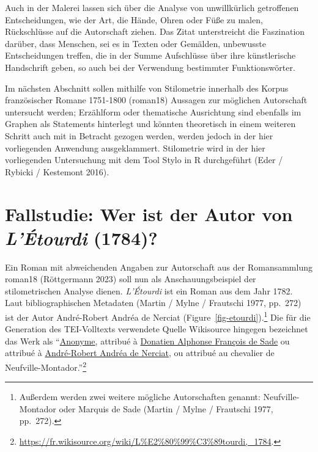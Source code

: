\documentclass[
  12pt,
  letterpaper,
  DIV=11,
  numbers=noendperiod]{scrreprt}
\begin{document}
Auch in der Malerei lassen sich über die Analyse von unwillkürlich
getroffenen Entscheidungen, wie der Art, die Hände, Ohren oder Füße zu
malen, Rückschlüsse auf die Autorschaft ziehen. Das Zitat unterstreicht
die Faszination darüber, dass Menschen, sei es in Texten oder Gemälden,
unbewusste Entscheidungen treffen, die in der Summe Aufschlüsse über
ihre künstlerische Handschrift geben, so auch bei der Verwendung
bestimmter Funktionswörter.

Im nächsten Abschnitt sollen mithilfe von Stilometrie innerhalb des
Korpus französischer Romane 1751-1800 (roman18) Aussagen zur möglichen
Autorschaft untersucht werden; Erzählform oder thematische Ausrichtung
sind ebenfalls im Graphen als Statements hinterlegt und könnten
theoretisch in einem weiteren Schritt auch mit in Betracht gezogen
werden, werden jedoch in der hier vorliegenden Anwendung ausgeklammert.
Stilometrie wird in der hier vorliegenden Untersuchung mit dem Tool
Stylo in R durchgeführt (Eder / Rybicki / Kestemont 2016).

\section{\texorpdfstring{Fallstudie: Wer ist der Autor von
\emph{L'Étourdi}
(1784)?}{Fallstudie: Wer ist der Autor von L'Étourdi (1784)?}}\label{fallstudie-wer-ist-der-autor-von-luxe9tourdi-1784}

Ein Roman mit abweichenden Angaben zur Autorschaft aus der Romansammlung
roman18 (Röttgermann 2023) soll nun als Anschauungsbeispiel der
stilometrischen Analyse dienen. \emph{L'Étourdi} ist ein Roman aus dem
Jahr 1782. Laut bibliographischen Metadaten (Martin / Mylne / Frautschi
1977, pp.~272) ist der Autor André-Robert Andréa de Nerciat
(Figure~\ref{fig-etourdi}).\footnote{Außerdem werden zwei weitere
  mögliche Autorschaften genannt: Neufville-Montador oder Marquis de
  Sade (Martin / Mylne / Frautschi 1977, pp.~272).} Die für die
Generation des TEI-Volltexts verwendete Quelle Wikisource hingegen
bezeichnet das Werk als
``\href{https://fr.wikisource.org/wiki/Auteur:Anonyme}{Anonyme},
attribué à
\href{https://fr.wikisource.org/wiki/Auteur:Donatien_Alphonse_Fran\%C3\%A7ois_de_Sade}{Donatien
Alphonse François de Sade} ou attribué à
\href{https://fr.wikisource.org/wiki/Auteur:Andr\%C3\%A9-Robert_Andr\%C3\%A9a_de_Nerciat}{André-Robert
Andréa de Nerciat}, ou attribué au chevalier de
Neufville-Montador.''\footnote{\url{https://fr.wikisource.org/wiki/L\%E2\%80\%99\%C3\%89tourdi,_1784}.}
\end{document}
